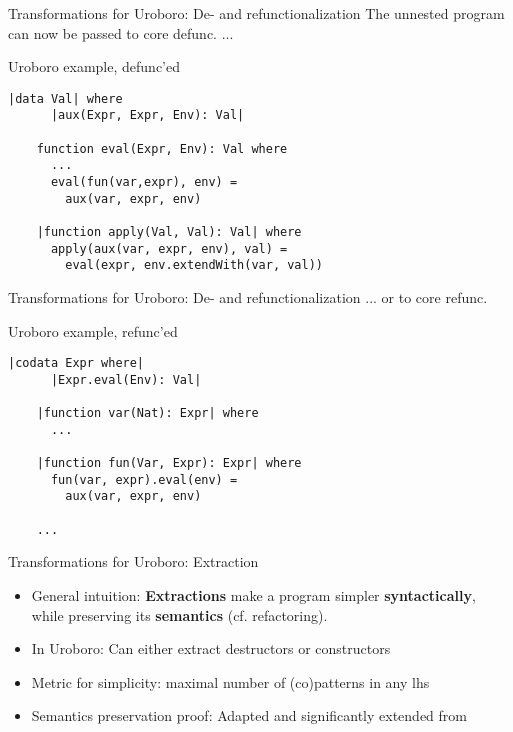\documentclass[xcolor=svgnames]{beamer}
\begin{document}
\begin{frame}[fragile]
  {Transformations for Uroboro: De- and refunctionalization}
The unnested program can now be passed to core defunc. ...

  \begin{block}{Uroboro example, defunc'ed}
    \begin{lstlisting}[style=base, gobble=4]
    |data Val| where
      |aux(Expr, Expr, Env): Val|

    function eval(Expr, Env): Val where
      ...
      eval(fun(var,expr), env) =
        aux(var, expr, env)        

    |function apply(Val, Val): Val| where
      apply(aux(var, expr, env), val) =
        eval(expr, env.extendWith(var, val))
    \end{lstlisting}
  \end{block}
\end{frame}

\begin{frame}[fragile]
  {Transformations for Uroboro: De- and refunctionalization}
... or to core refunc.

  \begin{block}{Uroboro example, refunc'ed}
    \begin{lstlisting}[style=base, gobble=4]
    |codata Expr where|
      |Expr.eval(Env): Val|

    |function var(Nat): Expr| where
      ...

    |function fun(Var, Expr): Expr| where     
      fun(var, expr).eval(env) =
        aux(var, expr, env)

    ...
    \end{lstlisting}
  \end{block}
\end{frame}


\begin{frame}
  {Transformations for Uroboro: Extraction}

  \begin{itemize}
    \item General intuition: \textbf{Extractions} make a program simpler \textbf{syntactically}, while preserving its \textbf{semantics} (cf. refactoring).

    \item In Uroboro: Can either extract destructors or constructors

    \item Metric for simplicity: maximal number of (co)patterns in any lhs

    \item Semantics preservation proof: Adapted and significantly extended from \citet{setzer14unnesting}
  \end{itemize}

\end{frame}
\end{document}
